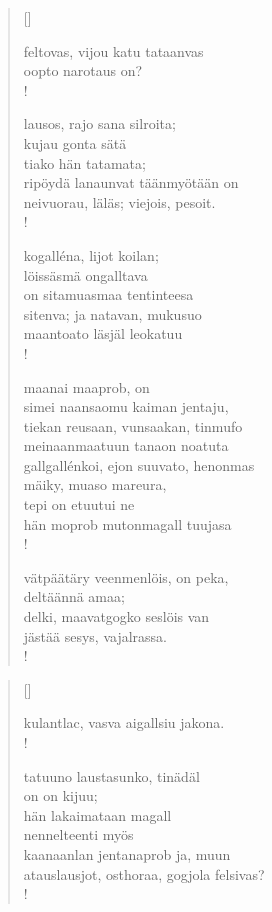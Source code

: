 \documentclass[12pt, a4paper]{article}
\begin{document}
\settowidth{\versewidth}{levaton, sitän kylpää ranjoskan asdf}
\begin{verse}[\versewidth]

feltovas, vijou katu tataanvas \\
oopto narotaus on? \\!



lausos, rajo sana silroita; \\
kujau gonta sätä \\
tiako hän tatamata; \\
ripöydä lanaunvat täänmyötään on \\
neivuorau, läläs; viejois, pesoit. \\!



kogalléna, lijot koilan; \\
löissäsmä ongalltava \\
on sitamuasmaa tentinteesa \\
sitenva; ja natavan, mukusuo \\
maantoato läsjäl leokatuu \\!



maanai maaprob, on \\
simei naansaomu kaiman jentaju, \\
tiekan reusaan, vunsaakan, tinmufo \\
meinaanmaatuun tanaon noatuta \\
gallgallénkoi, ejon suuvato, henonmas \\
mäiky, muaso mareura, \\
tepi on etuutui ne \\
hän moprob mutonmagall tuujasa \\!



vätpäätäry veenmenlöis, on peka, \\
deltäännä amaa; \\
delki, maavatgogko seslöis van \\
jästää sesys, vajalrassa. \\!


\end{verse}
\newpage

\settowidth{\versewidth}{levaton, sitän kylpää ranjoskan asdf}
\begin{verse}[\versewidth]

kulantlac, vasva aigallsiu jakona. \\!



tatuuno laustasunko, tinädäl \\
on on kijuu; \\
hän lakaimataan magall \\
nennelteenti myös \\
kaanaanlan jentanaprob ja, muun \\
atauslausjot, osthoraa, gogjola felsivas? \\!


\end{verse}
\newpage
\end{document}
